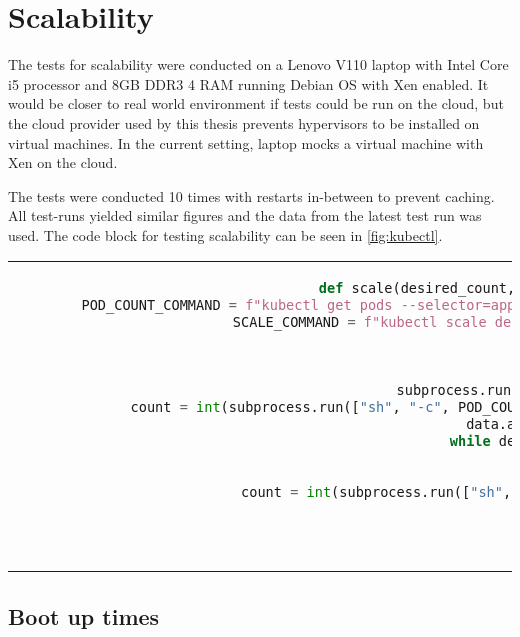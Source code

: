 \section{Scalability}
The tests for scalability were conducted on a Lenovo V110 laptop with Intel Core i5 processor and 8GB DDR3 4 RAM running Debian OS with Xen enabled. It would be closer to real world environment if tests could be run on the cloud, but the cloud provider used by this thesis prevents hypervisors to be installed on virtual machines. In the current setting, laptop mocks a virtual machine with Xen on the cloud.

The tests were conducted 10 times with restarts in-between to prevent caching. All test-runs yielded similar figures and the data from the latest test run was used. The code block for testing scalability can be seen in \ref{fig:kubectl}.

\begin{code}[htpb]
  \centering
  \begin{tabular}{c}
  \begin{lstlisting}[language=Python]
    def scale(desired_count, deployment_name): # usage: result = scale("nginx",20)
        POD_COUNT_COMMAND = f"kubectl get pods --selector=app={deployment_name} | grep 'Running\|Terminating' | wc -l" # get running or terminating pods
        SCALE_COMMAND = f"kubectl scale deployment {deployment_name} --replicas {desired_count}" # scale deployment
        data = []
        second = 0
        INTERVAL = 0.5
        subprocess.run(["sh", "-c", SCALE_COMMAND]) # execute scale command
        count = int(subprocess.run(["sh", "-c", POD_COUNT_COMMAND], stdout = subprocess.PIPE).stdout.decode("utf-8")) # count number of pods
        data.append([second, count]) # save number of pods
        while desired_count != count: # continue while scaling
            time.sleep(INTERVAL)
            second += INTERVAL
            count = int(subprocess.run(["sh", "-c", POD_COUNT_COMMAND], stdout = subprocess.PIPE).stdout.decode("utf-8"))
            data.append([second, count])

        return data

\end{lstlisting}
\end{tabular}
\caption{Testing Scalability}\label{fig:kubectl}
\end{code}
\subsection{Boot up times}


